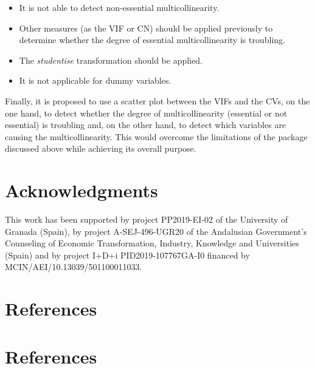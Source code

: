 \begin{itemize}
\tightlist
\item
  It is not able to detect non-essential multicollinearity.
\item
  Other measures (as the VIF or CN) should be applied previously to determine whether the degree of essential multicollinearity is troubling.
\item
  The \emph{studentise} transformation should be applied.
\item
  It is not applicable for dummy variables.
\end{itemize}

Finally, it is proposed to use a scatter plot between the VIFs and the CVs, on the one hand, to detect whether the degree of multicollinearity (essential or not essential) is troubling and, on the other hand, to detect which variables are causing the multicollinearity. This would overcome the limitations of the  package discussed above while achieving its overall purpose.

\hypertarget{acknowledgments}{%
\section{Acknowledgments}\label{acknowledgments}}

This work has been supported by project PP2019-EI-02 of the University of Granada (Spain), by project A-SEJ-496-UGR20 of the Andalusian Government's Counseling of Economic Transformation, Industry, Knowledge and Universities (Spain) and by project I+D+i PID2019-107767GA-I0 financed by MCIN/AEI/10.13039/501100011033.

\hypertarget{references}{%
\section{References}\label{references}}

\hypertarget{references-1}{%
\section*{References}\label{references-1}}

